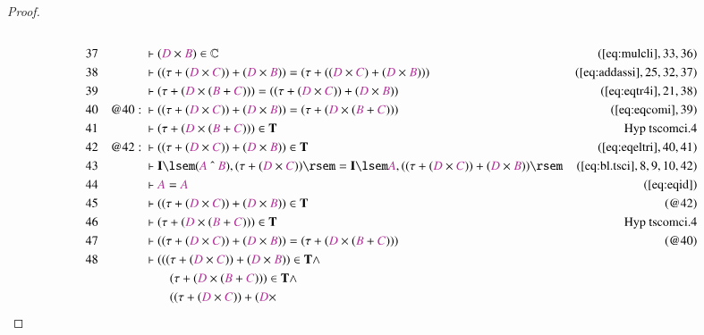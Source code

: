 \begin{proof}
\begin{align}
  \\ 37 &&  & \vdash ( \mc{D} \times \mc{B} ) \in
      \mathbb{C}&(\mbox{\ref{eq:mulcli}},33,36)\notag
  \\ 38 &&  & \vdash ( ( \tau + ( \mc{D} \times \mc{C} ) ) + ( \mc{D} \times
      \mc{B} ) ) = ( \tau + ( ( \mc{D} \times \mc{C} ) + (
      \mc{D} \times \mc{B} ) )
      )&(\mbox{\ref{eq:addassi}},25,32,37)\notag
  \\ 39 &&  & \vdash ( \tau + ( \mc{D} \times ( \mc{B} + \mc{C} ) ) ) = ( ( \tau
      + ( \mc{D} \times \mc{C} ) ) + ( \mc{D} \times \mc{B} )
      )&(\mbox{\ref{eq:eqtr4i}},21,38)\notag
  \\ 40 && @40:\  & \vdash ( ( \tau + ( \mc{D} \times \mc{C} ) ) + ( \mc{D}
      \times \mc{B} ) ) = ( \tau + ( \mc{D} \times ( \mc{B} +
      \mc{C} ) ) )&(\mbox{\ref{eq:eqcomi}},39)\notag
  \\ 41 &&  & \vdash ( \tau + ( \mc{D} \times ( \mc{B} + \mc{C} ) ) ) \in
      \mathbf{T}&\text{Hyp~tscomci.4}\notag%
  \\ 42 && @42:\  & \vdash ( ( \tau + ( \mc{D} \times \mc{C} ) ) + ( \mc{D}
      \times \mc{B} ) ) \in
      \mathbf{T}&(\mbox{\ref{eq:eqeltri}},40,41)\notag
  \\ 43 &&  & \vdash \mathbf{I} \lsem ( \mc{A} ~\string^~ \mc{B} ) , ( \tau + (
      \mc{D} \times \mc{C} ) ) \rsem = \mathbf{I} \lsem
      \mc{A} , ( ( \tau + ( \mc{D} \times \mc{C} ) ) + (
      \mc{D} \times \mc{B} ) )
      \rsem&(\mbox{\ref{eq:bl.tsci}},8,9,10,42)\notag
  \\ 44 &&  & \vdash \mc{A} = \mc{A}&(\mbox{\ref{eq:eqid}})\notag
  \\ 45 &&  & \vdash ( ( \tau + ( \mc{D} \times \mc{C} ) ) + ( \mc{D} \times
      \mc{B} ) ) \in \mathbf{T}&(@42)\notag
  \\ 46 &&  & \vdash ( \tau + ( \mc{D} \times ( \mc{B} + \mc{C} ) ) ) \in
      \mathbf{T}&\text{Hyp~tscomci.4}\notag%
  \\ 47 &&  & \vdash ( ( \tau + ( \mc{D} \times \mc{C} ) ) + ( \mc{D} \times
      \mc{B} ) ) = ( \tau + ( \mc{D} \times ( \mc{B} +
      \mc{C} ) ) )&(@40)\notag
  \\ 48 &&  & \vdash ( ( ( \tau + ( \mc{D} \times \mc{C} ) ) + ( \mc{D} \times
      \mc{B} ) ) \in \mathbf{T} \wedge \notag \\ & & & \qquad
       ( \tau + ( \mc{D}
      \times ( \mc{B} + \mc{C} ) ) ) \in \mathbf{T} \wedge \notag \\ & & & \qquad
       (
      ( \tau + ( \mc{D} \times \mc{C} ) ) + ( \mc{D} \times

\end{align}
\end{proof}
